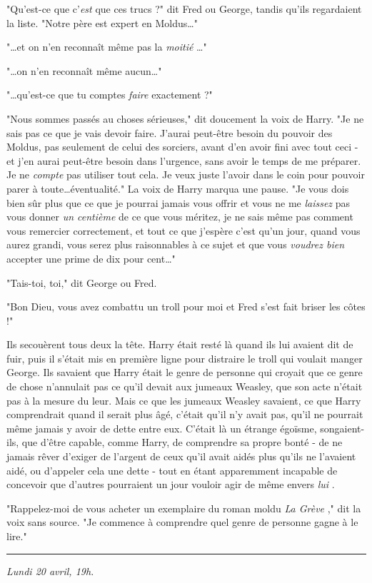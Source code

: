 "Qu'est-ce que c'\emph{est}  que ces trucs ?" dit Fred ou George, tandis qu'ils regardaient la liste. "Notre père est expert en Moldus…"

"…et on n'en reconnaît même pas la \emph{moitié} …"

"…on n'en reconnaît même aucun…"

"…qu'est-ce que tu comptes \emph{faire}  exactement ?"

"Nous sommes passés au choses sérieuses," dit doucement la voix de Harry. "Je ne sais pas ce que je vais devoir faire. J'aurai peut-être besoin du pouvoir des Moldus, pas seulement de celui des sorciers, avant d'en avoir fini avec tout ceci - et j'en aurai peut-être besoin dans l'urgence, sans avoir le temps de me préparer. Je ne \emph{compte}  pas utiliser tout cela. Je veux juste l'avoir dans le coin pour pouvoir parer à toute…éventualité." La voix de Harry marqua une pause. "Je vous dois bien sûr plus que ce que je pourrai jamais vous offrir et vous ne me \emph{laissez}  pas vous donner \emph{un centième}  de ce que vous méritez, je ne sais même pas comment vous remercier correctement, et tout ce que j'espère c'est qu'un jour, quand vous aurez grandi, vous serez plus raisonnables à ce sujet et que vous \emph{voudrez bien}  accepter une prime de dix pour cent…"

"Tais-toi, toi," dit George ou Fred.

"Bon Dieu, vous avez combattu un troll pour moi et Fred s'est fait briser les côtes !"

Ils secouèrent tous deux la tête. Harry était resté là quand ils lui avaient dit de fuir, puis il s'était mis en première ligne pour distraire le troll qui voulait manger George. Ils savaient que Harry était le genre de personne qui croyait que ce genre de chose n'annulait pas ce qu'il devait aux jumeaux Weasley, que son acte n'était pas à la mesure du leur. Mais ce que les jumeaux Weasley savaient, ce que Harry comprendrait quand il serait plus âgé, c'était qu'il n'y avait pas, qu'il ne pourrait même jamais y avoir de dette entre eux. C'était là un étrange égoïsme, songaient-ils, que d'être capable, comme Harry, de comprendre sa propre bonté - de ne jamais rêver d'exiger de l'argent de ceux qu'il avait aidés plus qu'ils ne l'avaient aidé, ou d'appeler cela une dette - tout en étant apparemment incapable de concevoir que d'autres pourraient un jour vouloir agir de même envers \emph{lui} .

"Rappelez-moi de vous acheter un exemplaire du roman moldu \emph{La Grève} ," dit la voix sans source. "Je commence à comprendre quel genre de personne gagne à le lire."
\par\noindent\rule{\textwidth}{0.4pt}
\emph{Lundi 20 avril, 19h.} 

